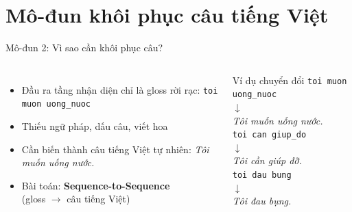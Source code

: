 ﻿\documentclass[aspectratio=169, 11pt]{beamer}
\begin{document}
\section{Mô-đun khôi phục câu tiếng Việt}

\begin{frame}{Mô-đun 2: Vì sao cần khôi phục câu?}
    \begin{columns}[T]
        \begin{itemize}
            \item Đầu ra tầng nhận diện chỉ là gloss rời rạc:
            {\small\color{footergray} \texttt{toi muon uong\_nuoc}}
            \item Thiếu ngữ pháp, dấu câu, viết hoa
            \item Cần biến thành câu tiếng Việt tự nhiên:
            {\small\color{deepblue} \textit{Tôi muốn uống nước.}}
            \item Bài toán: \textbf{Sequence-to-Sequence}\\
            (gloss $\rightarrow$ câu tiếng Việt)
        \end{itemize}

        \begin{exampleblock}{Ví dụ chuyển đổi}
            \scriptsize
            \texttt{toi muon uong\_nuoc}\\
            $\downarrow$\\
            \textit{Tôi muốn uống nước.}\\[6pt]
            \texttt{toi can giup\_do}\\
            $\downarrow$\\
            \textit{Tôi cần giúp đỡ.}\\[6pt]
            \texttt{toi dau bung}\\
            $\downarrow$\\
            \textit{Tôi đau bụng.}
        \end{exampleblock}
    \end{columns}
\end{frame}
\end{document}
